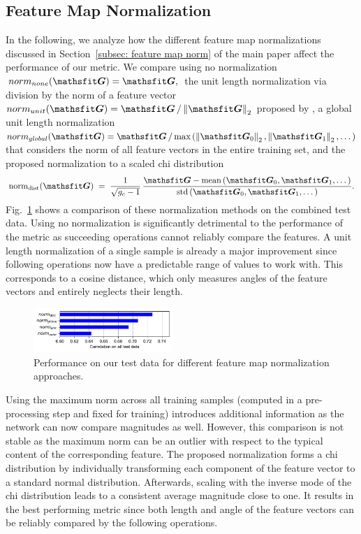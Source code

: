 \subsection{Feature Map Normalization} \label{append: feature map norm}
In the following, we analyze how the different feature map normalizations discussed in Section~\ref{subsec: feature map norm} of the main paper affect the performance of our metric. We compare using no normalization $norm_{none}(\tG) = \tG,$ the unit length normalization via division by the norm of a feature vector $norm_{unit}(\tG) = \tG \, / \left\| \tG \right\|_2$ proposed by \citeauthor{zhang2018}, a global unit length normalization $norm_{global}(\tG) = \tG \, / \, \text{max} \left(  \left\| \tG_0 \right\|_2,  \left\| \tG_1 \right\|_2, \dotsc  \right)$ that considers the norm of all feature vectors in the entire training set, and the proposed normalization to a scaled chi distribution
\begin{equation*}
    \text{norm}_{\text{dist}}(\tG) \;=\; \frac{1}{\sqrt{g_c - 1}} \, \frac{\tG - \text{mean} \left(  \tG_0, \tG_1, \dotsc  \right)}
    {\text{std} \left(  \tG_0, \tG_1, \dotsc  \right)}.
\end{equation*}
Fig.~\ref{fig: normalization} shows a comparison of these normalization methods on the combined test data. Using no normalization is significantly detrimental to the performance of the metric as succeeding operations cannot reliably compare the features. A unit length normalization of a single sample is already a major improvement since following operations now have a predictable range of values to work with. This corresponds to a cosine distance, which only measures angles of the feature vectors and entirely neglects their length.
\begin{figure}[ht]
    \centering
    \vspace{-0.2cm}
    \includegraphics[width=0.47\textwidth]{Images/Normalization}
    \vspace{-0.5cm}
    \caption{Performance on our test data for different feature map normalization approaches.}
    \label{fig: normalization}
    \vspace{-0.2cm}
\end{figure}

Using the maximum norm across all training samples (computed in a pre-processing step and fixed for training) introduces additional information as the network can now compare magnitudes as well. However, this comparison is not stable as the maximum norm can be an outlier with respect to the typical content of the corresponding feature. The proposed normalization forms a chi distribution by individually transforming each component of the feature vector to a standard normal distribution. Afterwards, scaling with the inverse mode of the chi distribution leads to a consistent average magnitude close to one. It results in the best performing metric since both length and angle of the feature vectors can be reliably compared by the following operations.


